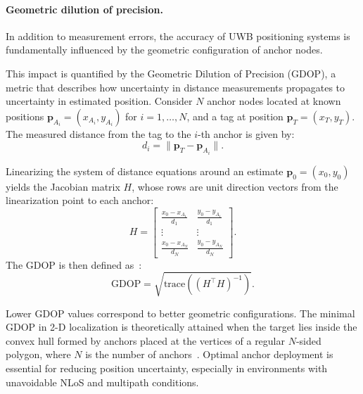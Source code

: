 \paragraph{Geometric dilution of precision.}
In addition to measurement errors, the accuracy of UWB positioning systems is fundamentally influenced by the geometric configuration of anchor nodes.

This impact is quantified by the Geometric Dilution of Precision (GDOP), a metric that describes how uncertainty in distance measurements propagates to uncertainty in estimated position. Consider $N$ anchor nodes located at known positions $\mathbf{p}_{A_i} = (x_{A_i}, y_{A_i})$ for $i = 1, \dots, N$, and a tag at position $\mathbf{p}_T = (x_T, y_T)$. The measured distance from the tag to the $i$-th anchor is given by:
\begin{equation}
d_i = \|\mathbf{p}_T - \mathbf{p}_{A_i}\|.
\end{equation}

Linearizing the system of distance equations around an estimate $\mathbf{p}_0 = (x_0, y_0)$ yields the Jacobian matrix $H$, whose rows are unit direction vectors from the linearization point to each anchor:
\begin{equation}
H = \begin{bmatrix}
\frac{x_0 - x_{A_1}}{d_1} & \frac{y_0 - y_{A_1}}{d_1} \\
\vdots & \vdots \\
\frac{x_0 - x_{A_N}}{d_N} & \frac{y_0 - y_{A_N}}{d_N}
\end{bmatrix}.
\end{equation}
The GDOP is then defined as~\cite{Wang2022GDOP}:
\begin{equation}
\text{GDOP} = \sqrt{\text{trace}\left((H^\top H)^{-1}\right)}.
\end{equation}

Lower GDOP values correspond to better geometric configurations. The minimal GDOP in 2-D localization is theoretically attained when the target lies inside the convex hull formed by anchors placed at the vertices of a regular $N$-sided polygon, where $N$ is the number of anchors~\cite{Wang2022GDOP,Levanon2000GDOP}. Optimal anchor deployment is essential for reducing position uncertainty, especially in environments with unavoidable NLoS and multipath conditions.